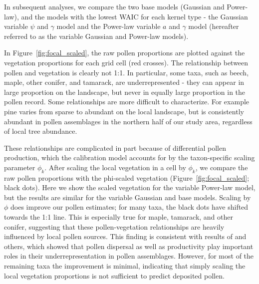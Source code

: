 \documentclass[12pt]{article}
\begin{document}
In subsequent analyses, we compare the two base models (Gaussian and
Power-law), and the models with the lowest WAIC for each kernel type -
the Gaussian variable $\psi$ and $\gamma$ model and the Power-law
variable $a$ and $\gamma$ model (hereafter referred to as the variable
Gaussian and Power-law models).

In Figure~\ref{fig:focal_scaled}, the raw pollen proportions are
plotted against the vegetation proportions for each grid cell (red
crosses). The relationship between pollen and vegetation is clearly
not 1:1. In particular, some taxa, such as beech, maple, other conifer, and
tamarack, are underrepresented - they can appear in large proportion
on the landscape, but never in equally large proportion in the pollen
record. Some relationships are more difficult to characterize. For
example pine varies from sparse to abundant on the local landscape,
but is consistently abundant in pollen assemblages in the northern
half of our study area, regardless of local tree abundance.

These relationships are complicated in part because of differential
pollen production, which the calibration model accounts for by the
taxon-specific scaling parameter $\phi_k$. After scaling the local
vegetation in a cell by $\phi_k$, we compare the raw pollen
proportions with the phi-scaled vegetation
(Figure~\ref{fig:focal_scaled}; black dots). Here we show the scaled
vegetation for the variable Power-law model, but the results are
similar for the variable Gaussian and base models. Scaling by $\phi$
does improve our pollen estimates; for many taxa, the black dots have
shifted towards the 1:1 line. This is especially true for maple,
tamarack, and other conifer, suggesting that these pollen-vegetation
relationships are heavily influenced by local pollen sources. This
finding is consistent with results of \citet{jackson1990,
  jackson1991pollen} and others, which showed that pollen dispersal as well as
productivity play important roles in their underrepresentation in
pollen assemblages. However, for most of the remaining taxa the
improvement is minimal, indicating that simply scaling the local
vegetation proportions is not sufficient to predict deposited pollen.
\end{document}
